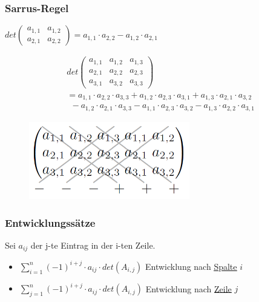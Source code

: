 \documentclass{scrartcl}
\newcommand{\linkToRef}[2][ref]{\hyperref[#1]{\underline{#2}}}
\begin{document}
        \subsubsection{Sarrus-Regel}
        \label{Sarrus-Regel}
        \begin{Notiz}[Für 2x2]
        $det\begin{pmatrix} 
        a_{1,1} & a_{1,2} \\
        a_{2,1} & a_{2,2}
        \end{pmatrix} = a_{1,1} \cdot a_{2,2} - a_{1,2} \cdot a_{2,1} $ 
        \end{Notiz}
        
        \begin{Def}
             \begin{align*}
                &det\begin{pmatrix} a_{1,1} & a_{1,2} & a_{1,3}\\a_{2,1} & a_{2,2} & a_{2,3}\\a_{3,1} & a_{3,2} &                       a_{3,3} \end{pmatrix} \\
                &= a_{1,1} \cdot a_{2,2} \cdot a_{3,3} + a_{1,2} \cdot a_{2,3} \cdot a_{3,1} + a_{1,3} \cdot                            a_{2,1} \cdot a_{3,2} \\
                &~~- a_{1,2} \cdot a_{2,1} \cdot a_{3,3} - a_{1,1} \cdot a_{2,3} \cdot a_{3,2} - a_{1,3} \cdot                          a_{2,2} \cdot a_{3,1}
        \end{align*}
        \begin{figure}[H]
            \centering
            \includegraphics[width=7cm]{Sarrus-Regel}
            \label{fig:sarrus}
        \end{figure}
        \end{Def}
        
        
        \subsubsection{Entwicklungssätze}
        \begin{Def}
            Sei $a_{ij}$ der j-te Eintrag in der i-ten Zeile.
            \begin{itemize}
                \item $\sum_{i = 1}^{n} (-1)^{i + j} \cdot a_{ij} \cdot det(A_{i,j})$ Entwicklung nach \linkToRef[Zeilenvektor]{Spalte} $i$
                \item $\sum_{j = 1}^{n} (-1)^{i + j} \cdot a_{ij} \cdot det(A_{i,j})$ Entwicklung nach \linkToRef[Zeilenvektor]{Zeile} $j$
            \end{itemize}
        \end{Def}
    
\end{document}
